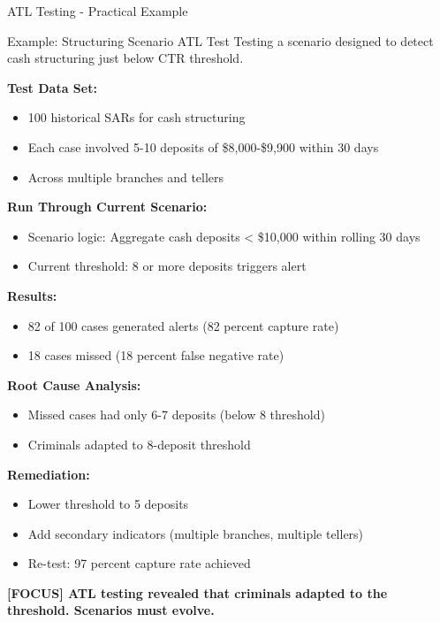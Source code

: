\documentclass[11pt,a4paper]{beamer}
\newcommand{\examfocus}[1]{\textcolor{orange!80!black}{\textbf{[FOCUS] #1}}}
\begin{document}
	\begin{frame}{ATL Testing - Practical Example}
		\begin{block}{Example: Structuring Scenario ATL Test}
			Testing a scenario designed to detect cash structuring just below CTR threshold.
		\end{block}
		
		\textbf{Test Data Set:}
		\begin{itemize}
			\item 100 historical SARs for cash structuring
			\item Each case involved 5-10 deposits of \$8,000-\$9,900 within 30 days
			\item Across multiple branches and tellers
		\end{itemize}
		
		\textbf{Run Through Current Scenario:}
		\begin{itemize}
			\item Scenario logic: Aggregate cash deposits < \$10,000 within rolling 30 days
			\item Current threshold: 8 or more deposits triggers alert
		\end{itemize}
		
		\textbf{Results:}
		\begin{itemize}
			\item 82 of 100 cases generated alerts (82 percent capture rate)
			\item 18 cases missed (18 percent false negative rate)
		\end{itemize}
		
		\textbf{Root Cause Analysis:}
		\begin{itemize}
			\item Missed cases had only 6-7 deposits (below 8 threshold)
			\item Criminals adapted to 8-deposit threshold
		\end{itemize}
		
		\textbf{Remediation:}
		\begin{itemize}
			\item Lower threshold to 5 deposits
			\item Add secondary indicators (multiple branches, multiple tellers)
			\item Re-test: 97 percent capture rate achieved
		\end{itemize}
		
		\examfocus{ATL testing revealed that criminals adapted to the threshold. Scenarios must evolve.}
	\end{frame}
	
\end{document}
